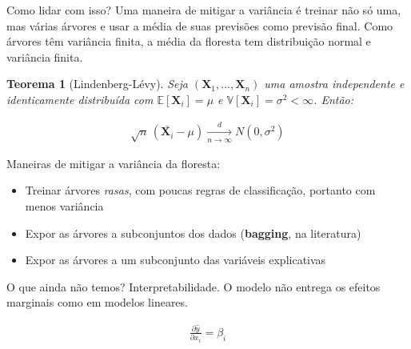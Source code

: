 \documentclass{beamer} %
\newtheorem{teo}{Teorema}
\newcommand{\E}{\mathbb{E}}
\newcommand{\V}{\mathbb{V}}
\newcommand{\1}{\mathbb{I}}
\begin{document}
\begin{frame}
Como lidar com isso? Uma maneira de mitigar a variância é treinar não só uma, mas várias árvores e usar a média de suas previsões como previsão final. Como árvores têm variância finita, a média da floresta tem distribuição normal e variância finita.

\begin{teo}[Lindenberg-Lévy]
Seja $(\textbf{X}_1, ..., \textbf{X}_n)$ uma amostra independente e identicamente distribuída com $\E[\textbf{X}_i] = \mu$ e $\V[\textbf{X}_i] = \sigma^2 < \infty$. Então:

\begin{align}
    \sqrt{n}\,(\bar{\textbf{X}_i }- \mu) \xrightarrow[n \to \infty]{d} N(0, \sigma^2)
\end{align}

\end{teo}
\end{frame}




\begin{frame}
Maneiras de mitigar a variância da floresta:

\begin{itemize}
    \item Treinar árvores \textit{rasas}, com poucas regras de classificação, portanto com menos variância
    \item Expor as árvores a subconjuntos dos dados (\textbf{bagging}, na literatura)
    \item Expor as árvores a um subconjunto das variáveis explicativas
\end{itemize}
\end{frame}



\begin{frame}
O que ainda não temos? Interpretabilidade. O modelo não entrega os efeitos marginais como em modelos lineares.



\begin{align}
    \frac{\partial \hat{y}}{\partial x_i} = \beta_i
\end{align}
\end{frame}
\end{document}
